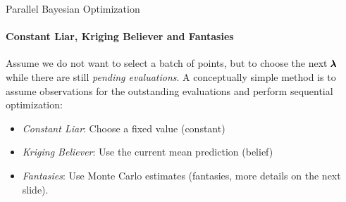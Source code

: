 \begin{frame}[c]{Parallel Bayesian Optimization}
\framesubtitle{Constant Liar, Kriging Believer and Fantasies}
Assume we do not want to select a batch of points, but to choose the next $\pmb{\lambda}$ while there are still \emph{pending evaluations}. 
\pause
%
A conceptually simple method is to assume observations for the outstanding evaluations and perform sequential optimization:
\pause
\begin{itemize}
    \item <+-> \emph{Constant Liar}: Choose a fixed value (constant) 
    \item <+-> \emph{Kriging Believer}: Use the current mean prediction (belief)  
    \item <+-> \emph{Fantasies}: Use Monte Carlo estimates (fantasies, more details on the next slide).
\end{itemize}
\end{frame}
